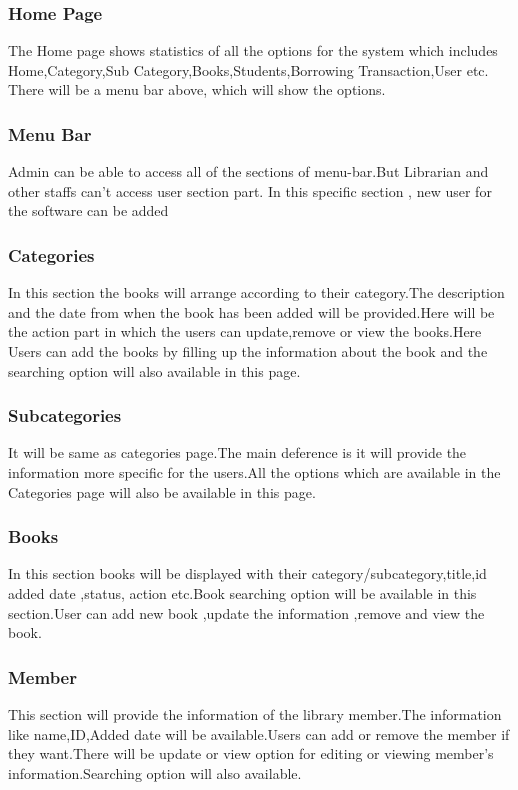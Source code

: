 \subsubsection{Home Page}
The Home page shows statistics of all the options for the system which includes Home,Category,Sub Category,Books,Students,Borrowing Transaction,User etc. There will be a menu bar above, which will show the options.

\subsubsection{Menu Bar}
Admin can be able to access all of the sections of menu-bar.But Librarian and other staffs can't access user section part. In this specific section , new user for the software can be added

\subsubsection{Categories}
In this section the books will arrange according to their category.The description and the date from when the book has been added will be provided.Here will be the action part in which the users can update,remove or view the books.Here Users can add the books by filling up the information about the book and the searching option will 
also available in this page.

\subsubsection{Subcategories}
It will be same as categories page.The main deference is it will provide the information more specific for the users.All the options which are available in the Categories page will also be available in this page.

\subsubsection{Books}
In this section books will be displayed with their category/subcategory,title,id added date ,status, action etc.Book searching option will be available in this section.User can add new book ,update the information ,remove and view the book.

\subsubsection{Member}
This section will provide the information of the library member.The information like name,ID,Added date will be available.Users can add or remove the member if they want.There will be update or view option for editing or viewing member's information.Searching option will also available.

